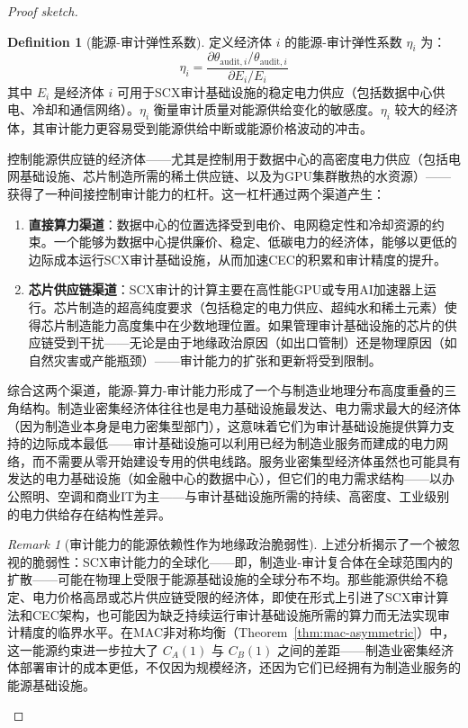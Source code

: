 \documentclass[12pt,a4paper]{ctexart}
\theoremstyle{definition}
\newtheorem{definition}{Definition}[section]
\theoremstyle{remark}
\newtheorem{remark}{Remark}[section]
\begin{document}
\begin{proof}[Proof sketch]
\begin{definition}[能源-审计弹性系数]
定义经济体 $i$ 的能源-审计弹性系数 $\eta_i$ 为：
\begin{equation}
\eta_i = \frac{\partial \theta_{\text{audit}, i} / \theta_{\text{audit}, i}}{\partial E_i / E_i}
\end{equation}
其中 $E_i$ 是经济体 $i$ 可用于SCX审计基础设施的稳定电力供应（包括数据中心供电、冷却和通信网络）。$\eta_i$ 衡量审计质量对能源供给变化的敏感度。$\eta_i$ 较大的经济体，其审计能力更容易受到能源供给中断或能源价格波动的冲击。
\end{definition}

控制能源供应链的经济体——尤其是控制用于数据中心的高密度电力供应（包括电网基础设施、芯片制造所需的稀土供应链、以及为GPU集群散热的水资源）——获得了一种间接控制审计能力的杠杆。这一杠杆通过两个渠道产生：

\begin{enumerate}[label=(\roman*)]
    \item \textbf{直接算力渠道}：数据中心的位置选择受到电价、电网稳定性和冷却资源的约束。一个能够为数据中心提供廉价、稳定、低碳电力的经济体，能够以更低的边际成本运行SCX审计基础设施，从而加速CEC的积累和审计精度的提升。
    \item \textbf{芯片供应链渠道}：SCX审计的计算主要在高性能GPU或专用AI加速器上运行。芯片制造的超高纯度要求（包括稳定的电力供应、超纯水和稀土元素）使得芯片制造能力高度集中在少数地理位置。如果管理审计基础设施的芯片的供应链受到干扰——无论是由于地缘政治原因（如出口管制）还是物理原因（如自然灾害或产能瓶颈）——审计能力的扩张和更新将受到限制。
\end{enumerate}

综合这两个渠道，能源-算力-审计能力形成了一个与制造业地理分布高度重叠的三角结构。制造业密集经济体往往也是电力基础设施最发达、电力需求最大的经济体（因为制造业本身是电力密集型部门），这意味着它们为审计基础设施提供算力支持的边际成本最低——审计基础设施可以利用已经为制造业服务而建成的电力网络，而不需要从零开始建设专用的供电线路。服务业密集型经济体虽然也可能具有发达的电力基础设施（如金融中心的数据中心），但它们的电力需求结构——以办公照明、空调和商业IT为主——与审计基础设施所需的持续、高密度、工业级别的电力供给存在结构性差异。

\begin{remark}[审计能力的能源依赖性作为地缘政治脆弱性]
上述分析揭示了一个被忽视的脆弱性：SCX审计能力的全球化——即，制造业-审计复合体在全球范围内的扩散——可能在物理上受限于能源基础设施的全球分布不均。那些能源供给不稳定、电力价格高昂或芯片供应链受限的经济体，即使在形式上引进了SCX审计算法和CEC架构，也可能因为缺乏持续运行审计基础设施所需的算力而无法实现审计精度的临界水平。在MAC非对称均衡（Theorem~\ref{thm:mac-asymmetric}）中，这一能源约束进一步拉大了 $C_A(1)$ 与 $C_B(1)$ 之间的差距——制造业密集经济体部署审计的成本更低，不仅因为规模经济，还因为它们已经拥有为制造业服务的能源基础设施。
\end{remark}


\end{proof}
\end{document}
